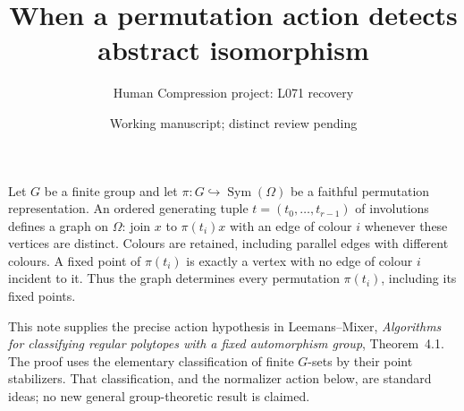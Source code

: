\documentclass[11pt,a4paper]{article}
\title{When a permutation action detects abstract isomorphism}
\author{Human Compression project: L071 recovery}
\date{Working manuscript; distinct review pending}
\newcommand{\Sym}{\operatorname{Sym}}
\begin{document}
\maketitle
Let $G$ be a finite group and let $\pi:G\hookrightarrow\Sym(\Omega)$
be a faithful permutation representation. An ordered generating tuple
$t=(t_0,\ldots,t_{r-1})$ of involutions defines a graph on $\Omega$:
join $x$ to $\pi(t_i)x$ with an edge of colour $i$ whenever these vertices
are distinct. Colours are retained, including parallel edges with
different colours. A fixed point of $\pi(t_i)$ is exactly a vertex
with no edge of colour $i$ incident to it. Thus the graph determines
every permutation $\pi(t_i)$, including its fixed points.

This note supplies the precise action hypothesis in Leemans--Mixer,
\emph{Algorithms for classifying regular polytopes with a fixed
automorphism group}, Theorem~4.1. The proof uses the elementary
classification of finite $G$-sets by their point stabilizers. That
classification, and the normalizer action below, are standard ideas;
no new general group-theoretic result is claimed.
\end{document}
